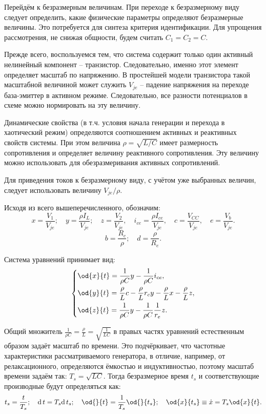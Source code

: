 Перейдём к безразмерным величинам.
При переходе к безразмерному виду следует определить,
какие физические параметры определяют безразмерные величины.
Это потребуется для синтеза критерия идентификации.
Для упрощения рассмотрения, не снижая общности,
будем считать $C_1 = C_2 = C$.

Прежде всего, воспользуемся тем, что система содержит только один
активный нелинейный компонент -- транзистор.
Следовательно, именно этот элемент определяет
масштаб по напряжению. В простейшей модели транзистора
такой масштабной величиной может служить
$V_{je}$ -- падение напряжения на переходе база-эмиттер
в активном режиме. Следовательно, все разности потенциалов в схеме можно нормировать
на эту величину.

Динамические свойства (в т.ч. условия начала генерации и перехода в хаотический режим) определяются
соотношением активных и реактивных свойств системы. При этом величина
$ \rho = \sqrt{L/C} $ имеет размерность сопротивления
и определяет величину реактивного сопротивления. Эту величину можно использовать
для обезразмеривания активных сопротивлений.

Для приведения токов к безразмерному виду, с учётом уже выбранных величин,
следует использовать величину $ V_{je} / \rho$.


Исходя из всего вышеперечисленного, обозначим:
%
\[
  x = \frac{V_{1}}{V_{je}} ; \quad
  y = \frac{\rho I_L}{V_{je}} ; \quad
  z = \frac{V_{2}}{V_{je}}, \quad
  i_{ce} = \frac{\rho I_{ce}}{V_{je}}, \quad
  c = \frac{V_{CC}}{V_{je}}, \quad
  e = \frac{V_{b}}{V_{je}}.
\]
%
\[
  b = \frac{R_c}{\rho}; \quad
  d = \frac{\rho}{R_e}. %
\]

Система уравнений принимает вид:
%
\begin{equation}
\label{atu:eq:colp_phys2}
\begin{dcases}
  \od{x}{t}  = \dfrac{1}{\rho C}  y - \dfrac{1}{\rho C} i_{ce} , \\
  \od{y}{t}  = \dfrac{\rho}{L} c    - \dfrac{\rho}{L} r_c y - \dfrac{\rho}{L} x- \dfrac{\rho}{L} z, \\
  \od{z}{t}  = \dfrac{1}{\rho C}  y - \dfrac{1}{\rho C} \dfrac{1}{r_e} z.
\end{dcases}
\end{equation}

Общий множитель $ \frac{1}{\rho C} = \frac{\rho}{L} = \sqrt{\frac{1}{LC}} $ в правых частях уравнений
естественным образом задаёт масштаб по времени.
Это подчёркивает, что частотные характеристики рассматриваемого генератора,
в отличие, например, от релаксационного,
определяются ёмкостью и индуктивностью,
поэтому масштаб времени задаём так:
$ T_s = \sqrt{L C} $.
Тогда безразмерное время $t_s$
и соответствующие производные
будут определяться как:
%
\[
  t_s = \frac{t}{T_s}; \quad
  \mathrm{d}\, t = T_s \mathrm{d}\, t_s; \quad
  \od{}{t}  = \frac{1}{T_s} \od{}{t_s}; \quad
  \od{x}{t_s} \equiv \dot{x} = T_s \od{x}{t} .
\]

